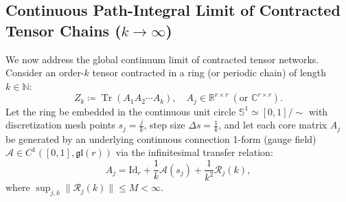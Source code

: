 \documentclass[11pt,a4paper,reqno]{amsart}
\theoremstyle{definition}
\numberwithin{equation}{section}
\newcommand{\R}{\mathbb{R}}
\newcommand{\C}{\mathbb{C}}
\newcommand{\N}{\mathbb{N}}
\newcommand{\Sph}{\mathbb{S}}
\newcommand{\Id}{\mathrm{Id}}
\newcommand{\Tr}{\operatorname{Tr}}
\begin{document}
\subsection{Continuous Path-Integral Limit of Contracted Tensor Chains ($k \to \infty$)}
\label{subsec:path_integral_gauge}
We now address the global continuum limit of contracted tensor networks. Consider an order-$k$ tensor contracted in a ring (or periodic chain) of length $k \in \N$:
\begin{equation}
    \label{eq:discrete_mps_trace}
    Z_k \coloneqq \Tr\left( A_1 A_2 \cdots A_k \right), \quad A_j \in \R^{r \times r} \ (\text{or } \C^{r \times r}).
\end{equation}
Let the ring be embedded in the continuous unit circle $\Sph^1 \simeq [0, 1]/\sim$ with discretization mesh points $s_j = \frac{j}{k}$, step size $\Delta s = \frac{1}{k}$, and let each core matrix $A_j$ be generated by an underlying continuous connection 1-form (gauge field) $\mathcal{A} \in C^1([0, 1], \mathfrak{gl}(r))$ via the infinitesimal transfer relation:
\begin{equation}
    \label{eq:transfer_generator}
    A_j = \Id_r + \frac{1}{k} \mathcal{A}(s_j) + \frac{1}{k^2} \mathcal{R}_j(k),
\end{equation}
where $\sup_{j, k} \|\mathcal{R}_j(k)\| \le M < \infty$.
\end{document}
